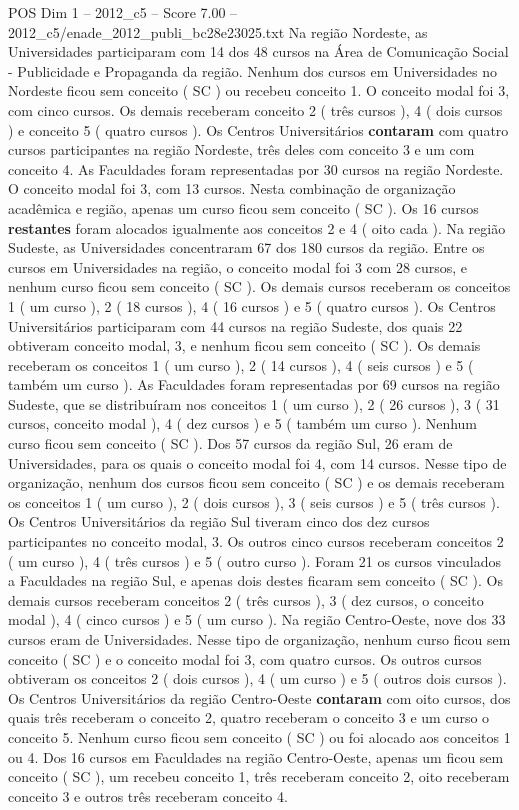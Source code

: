 \begin{textsample}{POS Dim 1 – 2012\_c5 – Score 7.00 – 2012\_c5/enade\_2012\_publi\_bc28e23025.txt}
Na região Nordeste, as Universidades participaram com 14 dos 48 cursos na Área de Comunicação Social - Publicidade e Propaganda da região.
Nenhum dos cursos em Universidades no Nordeste ficou sem conceito ( SC ) ou recebeu conceito 1.
O conceito modal foi 3, com cinco cursos.
Os demais receberam conceito 2 ( três cursos ), 4 ( dois cursos ) e conceito 5 ( quatro cursos ).
Os Centros Universitários \textbf{contaram} com quatro cursos participantes na região Nordeste, três deles com conceito 3 e um com conceito 4.
As Faculdades foram representadas por 30 cursos na região Nordeste.
O conceito modal foi 3, com 13 cursos.
Nesta combinação de organização acadêmica e região, apenas um curso ficou sem conceito ( SC ).
Os 16 cursos \textbf{restantes} foram alocados igualmente aos conceitos 2 e 4 ( oito cada ).
Na região Sudeste, as Universidades concentraram 67 dos 180 cursos da região.
Entre os cursos em Universidades na região, o conceito modal foi 3 com 28 cursos, e nenhum curso ficou sem conceito ( SC ).
Os demais cursos receberam os conceitos 1 ( um curso ), 2 ( 18 cursos ), 4 ( 16 cursos ) e 5 ( quatro cursos ).
Os Centros Universitários participaram com 44 cursos na região Sudeste, dos quais 22 obtiveram conceito modal, 3, e nenhum ficou sem conceito ( SC ).
Os demais receberam os conceitos 1 ( um curso ), 2 ( 14 cursos ), 4 ( seis cursos ) e 5 ( também um curso ).
As Faculdades foram representadas por 69 cursos na região Sudeste, que se distribuíram nos conceitos 1 ( um curso ), 2 ( 26 cursos ), 3 ( 31 cursos, conceito modal ), 4 ( dez cursos ) e 5 ( também um curso ).
Nenhum curso ficou sem conceito ( SC ).
Dos 57 cursos da região Sul, 26 eram de Universidades, para os quais o conceito modal foi 4, com 14 cursos.
Nesse tipo de organização, nenhum dos cursos ficou sem conceito ( SC ) e os demais receberam os conceitos 1 ( um curso ), 2 ( dois cursos ), 3 ( seis cursos ) e 5 ( três cursos ).
Os Centros Universitários da região Sul tiveram cinco dos dez cursos participantes no conceito modal, 3.
Os outros cinco cursos receberam conceitos 2 ( um curso ), 4 ( três cursos ) e 5 ( outro curso ).
Foram 21 os cursos vinculados a Faculdades na região Sul, e apenas dois destes ficaram sem conceito ( SC ).
Os demais cursos receberam conceitos 2 ( três cursos ), 3 ( dez cursos, o conceito modal ), 4 ( cinco cursos ) e 5 ( um curso ).
Na região Centro-Oeste, nove dos 33 cursos eram de Universidades.
Nesse tipo de organização, nenhum curso ficou sem conceito ( SC ) e o conceito modal foi 3, com quatro cursos.
Os outros cursos obtiveram os conceitos 2 ( dois cursos ), 4 ( um curso ) e 5 ( outros dois cursos ).
Os Centros Universitários da região Centro-Oeste \textbf{contaram} com oito cursos, dos quais três receberam o conceito 2, quatro receberam o conceito 3 e um curso o conceito 5.
Nenhum curso ficou sem conceito ( SC ) ou foi alocado aos conceitos 1 ou 4.
Dos 16 cursos em Faculdades na região Centro-Oeste, apenas um ficou sem conceito ( SC ), um recebeu conceito 1, três receberam conceito 2, oito receberam conceito 3 e outros três receberam conceito 4.

\end{textsample}
